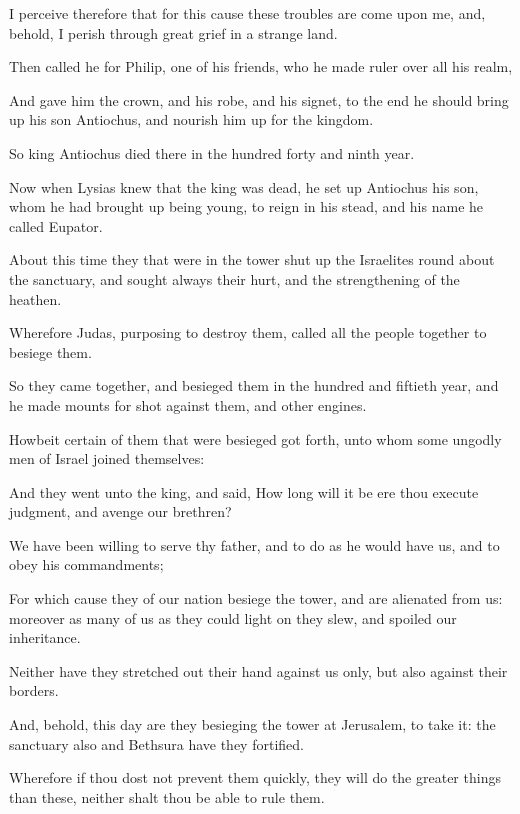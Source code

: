 {\par }{\PP {}I perceive therefore that for this cause these troubles are come upon me, and, behold, I perish through great grief in a strange land.
\par }{\PP {}Then called he for Philip, one of his friends, who he made ruler over all his realm,
\par }{\PP {}And gave him the crown, and his robe, and his signet, to the end he should bring up his son Antiochus, and nourish him up for the kingdom.
\par }{\PP {}So king Antiochus died there in the hundred forty and ninth year.
\par }{\PP {}Now when Lysias knew that the king was dead, he set up Antiochus his son, whom he had brought up being young, to reign in his stead, and his name he called Eupator.
\par }{\PP {}About this time they that were in the tower shut up the Israelites round about the sanctuary, and sought always their hurt, and the strengthening of the heathen.
\par }{\PP {}Wherefore Judas, purposing to destroy them, called all the people together to besiege them.
\par }{\PP {}So they came together, and besieged them in the hundred and fiftieth year, and he made mounts for shot against them, and other engines.
\par }{\PP {}Howbeit certain of them that were besieged got forth, unto whom some ungodly men of Israel joined themselves:
\par }{\PP {}And they went unto the king, and said, How long will it be ere thou execute judgment, and avenge our brethren?
\par }{\PP {}We have been willing to serve thy father, and to do as he would have us, and to obey his commandments;
\par }{\PP {}For which cause they of our nation besiege the tower, and are alienated from us: moreover as many of us as they could light on they slew, and spoiled our inheritance.
\par }{\PP {}Neither have they stretched out their hand against us only, but also against their borders.
\par }{\PP {}And, behold, this day are they besieging the tower at Jerusalem, to take it: the sanctuary also and Bethsura have they fortified.
\par }{\PP {}Wherefore if thou dost not prevent them quickly, they will do the greater things than these, neither shalt thou be able to rule them.
}
